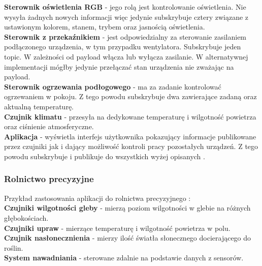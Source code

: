 \textbf{Sterownik oświetlenia RGB} - jego rolą jest kontrolowanie oświetlenia. Nie wysyła żadnych nowych informacji więc jedynie subskrybuje cztery  związane z ustawionym kolorem, stanem, trybem oraz jasnością oświetlenia.\\

\textbf{Sterownik z przekaźnikiem} - jest odpowiedzialny za sterowanie zasilaniem podłączonego urządzenia, w tym przypadku wentylatora. Subskrybuje jeden topic. W zależności od payload włącza lub wyłącza zasilanie. W alternatywnej implementacji mógłby jedynie przełączać stan urządzenia nie zważając na payload.\\

\textbf{Sterownik ogrzewania podłogowego} - ma za zadanie kontrolować ogrzewaniem w pokoju. Z tego powodu subskrybuje dwa  zawierające zadaną oraz aktualną temperaturę.\\

\textbf{Czujnik klimatu} - przesyła na dedykowane  temperaturę i wilgotność powietrza oraz ciśnienie atmosferyczne.\\

\textbf{Aplikacja} - wyświetla interfejs użytkownika pokazujący informacje publikowane przez czujniki jak i dający możliwość kontroli pracy pozostałych urządzeń. Z tego powodu subskrybuje i publikuje do wszystkich wyżej opisanych .\\

\newpage

\subsubsection{Rolnictwo precyzyjne}
Przykład zastosowania aplikacji do rolnictwa precyzyjnego \cite{rolnictwoprecyzyjne}:\\

\textbf{Czujniki wilgotności gleby} - mierzą poziom wilgotności w glebie na różnych głębokościach.\\

\textbf{Czujniki upraw} - mierzące temperaturę i wilgotność powietrza w polu.\\

\textbf{Czujnik nasłonecznienia} - mierzy ilość światła słonecznego docierającego do roślin.\\

\textbf{System nawadniania} - sterowane zdalnie na podstawie danych z sensorów.\\

